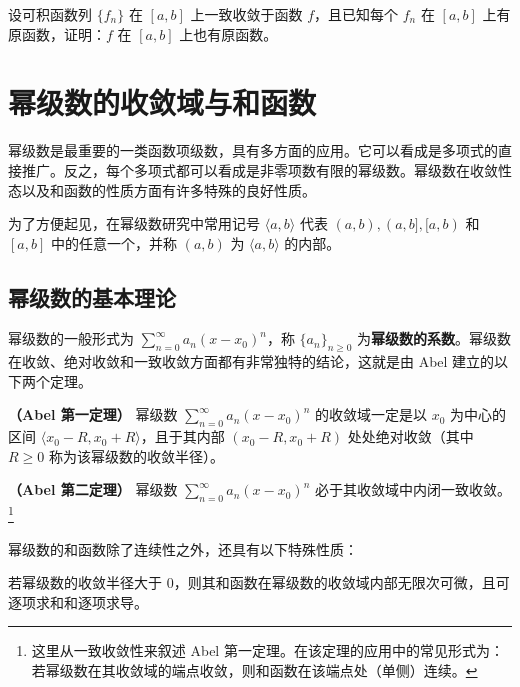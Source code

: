 \begin{xexercise}[8]
设可积函数列 $\{f_n\}$ 在 $[a,b]$ 上一致收敛于函数 $f$，且已知每个 $f_n$ 在 $[a,b]$ 上有原函数，证明：$f$ 在 $[a,b]$ 上也有原函数。
\end{xexercise}

\section{幂级数的收敛域与和函数}

幂级数是最重要的一类函数项级数，具有多方面的应用。它可以看成是多项式的直接推广。反之，每个多项式都可以看成是非零项数有限的幂级数。幂级数在收敛性态以及和函数的性质方面有许多特殊的良好性质。

为了方便起见，在幂级数研究中常用记号 $\langle a,b\rangle$ 代表 $(a,b),(a,b],[a,b)$ 和 $[a,b]$ 中的任意一个，并称 $(a,b)$ 为 $\langle a,b\rangle$ 的内部。

\subsection{幂级数的基本理论}

幂级数的一般形式为 $\displaystyle\sum_{n=0}^{\infty}a_n(x-x_0)^n$，称 $\{a_n\}_{n\geqslant0}$ 为\textbf{幂级数的系数}。幂级数在收敛、绝对收敛和一致收敛方面都有非常独特的结论，这就是由 Abel 建立的以下两个定理。

\begin{xproposition}[14.3.1]
\textbf{（Abel 第一定理）} 幂级数 $\displaystyle\sum_{n=0}^{\infty}a_n(x-x_0)^n$ 的收敛域一定是以 $x_0$ 为中心的区间 $\langle x_0-R,x_0+R\rangle$，且于其内部 $(x_0-R,x_0+R)$ 处处绝对收敛（其中 $R\geqslant0$ 称为该幂级数的收敛半径）。
\end{xproposition}

\begin{xproposition}[14.3.2]
\textbf{（Abel 第二定理）} 幂级数 $\displaystyle\sum_{n=0}^{\infty}a_n(x-x_0)^n$ 必于其收敛域中内闭一致收敛。\footnote{这里从一致收敛性来叙述 Abel 第一定理。在该定理的应用中的常见形式为：若幂级数在其收敛域的端点收敛，则和函数在该端点处（单侧）连续。}
\end{xproposition}

幂级数的和函数除了连续性之外，还具有以下特殊性质：

\begin{xproposition}[14.3.3]
若幂级数的收敛半径大于 $0$，则其和函数在幂级数的收敛域内部无限次可微，且可逐项求和和逐项求导。
\end{xproposition}


